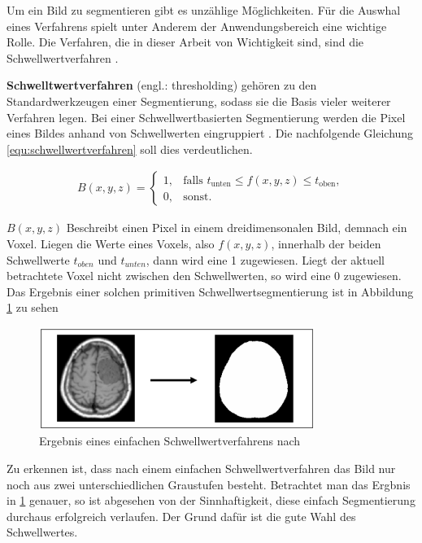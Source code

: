 Um ein Bild zu segmentieren gibt es unzählige Möglichkeiten. Für die Auswhal eines
Verfahrens spielt unter Anderem der Anwendungsbereich eine wichtige Rolle. Die
Verfahren, die in dieser Arbeit von Wichtigkeit sind, sind die
Schwellwertverfahren \citep[vgl.][Seite 361]{lehmann2013bildverarbeitung}.

\pagebreak

\textbf{Schwelltwertverfahren} (engl.: thresholding) gehören zu den
Standardwerkzeugen einer Segmentierung, sodass sie die Basis vieler weiterer Verfahren
legen. Bei einer Schwellwertbasierten Segmentierung werden die Pixel eines
Bildes anhand von Schwellwerten eingruppiert \citep[vgl.][Seite 96]{handels2000}.
Die nachfolgende Gleichung \ref{equ:schwellwertverfahren} soll dies verdeutlichen.

\begin{align}
	\label{equ:schwellwertverfahren}B(x, y, z) = \begin{cases}1,&\text{falls }t_{\text{unten}}\leq f(x, y, z) \leq t_{\text{oben}}, \\ 0,&\text{sonst}.\end{cases}
\end{align}

$B(x, y, z)$ Beschreibt einen Pixel in einem dreidimensonalen Bild, demnach ein Voxel.
Liegen die Werte eines Voxels, also $f(x, y, z)$, innerhalb der beiden
Schwellwerte $t_{oben}$ und $t_{unten}$, dann wird eine 1 zugewiesen. Liegt der
aktuell betrachtete Voxel nicht zwischen den Schwellwerten, so wird eine 0 zugewiesen.
Das Ergebnis einer solchen primitiven Schwellwertsegmentierung ist in Abbildung
\ref{fig:binäres_schwellwertverfahren} zu sehen

\begin{figure}[h]
	\centering
	\includegraphics[width=0.8\textwidth]{img/beispiel_schwellwertverfahren.jpg}
	\caption{Ergebnis eines einfachen Schwellwertverfahrens nach \citet[Seite 96]{handels2000}}
	\label{fig:binäres_schwellwertverfahren}
\end{figure}

Zu erkennen ist, dass nach einem einfachen Schwellwertverfahren das Bild nur noch
aus zwei unterschiedlichen Graustufen besteht. Betrachtet man das Ergbnis in
\ref{fig:binäres_schwellwertverfahren} genauer, so ist abgesehen von der Sinnhaftigkeit,
diese einfach Segmentierung durchaus erfolgreich verlaufen. Der Grund dafür ist die
gute Wahl des Schwellwertes.

